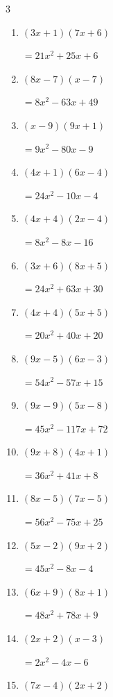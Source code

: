 \begin{multicols}{3}
\begin{enumerate}
        $=2x^{2}-19x+35$

\columnbreak %

\resetques

  \item $(3x+1)(7x+6)$

        $=21x^{2}+25x+6$

  \item $(8x-7)(x-7)$

        $=8x^{2}-63x+49$

  \item $(x-9)(9x+1)$

        $=9x^{2}-80x-9$

  \item $(4x+1)(6x-4)$

        $=24x^{2}-10x-4$

  \item $(4x+4)(2x-4)$

        $=8x^{2}-8x-16$

  \item $(3x+6)(8x+5)$

        $=24x^{2}+63x+30$

  \item $(4x+4)(5x+5)$

        $=20x^{2}+40x+20$

  \item $(9x-5)(6x-3)$

        $=54x^{2}-57x+15$

  \item $(9x-9)(5x-8)$

        $=45x^{2}-117x+72$

  \item $(9x+8)(4x+1)$

        $=36x^{2}+41x+8$

  \item $(8x-5)(7x-5)$

        $=56x^{2}-75x+25$

  \item $(5x-2)(9x+2)$

        $=45x^{2}-8x-4$

  \item $(6x+9)(8x+1)$

        $=48x^{2}+78x+9$

  \item $(2x+2)(x-3)$

        $=2x^{2}-4x-6$

  \item $(7x-4)(2x+2)$


\end{enumerate}
\end{multicols}
